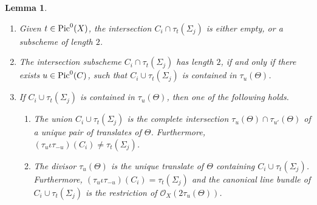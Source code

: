 \documentclass[12pt]{amsart}
\numberwithin{equation}{subsection}
\theoremstyle{plain}
\newtheorem{lem}[thm]{Lemma}
\theoremstyle{definition}
\newcommand{\StructureSheaf}[1]{{\mathcal O}_{#1}}
\newcommand{\Pic}{{\rm Pic}}
\begin{document}
\begin{lem}
\label{lemma-intersection-of-C-and-Sigma-has-length-at-most-2}
\begin{enumerate}
\item
\label{lemma-item-length-at-most-2}
Given $t\in \Pic^0(X)$, the intersection $C_i\cap \tau_t(\Sigma_j)$ is either empty, or a subscheme of length $2$.
\item
\label{lemma-item-length-is-2-iff}
The intersection subscheme $C_i\cap \tau_t(\Sigma_j)$ has length $2$, if and only if 
there exists $u\in\Pic^0(C)$, such that $C_i\cup \tau_t(\Sigma_j)$ is contained in $\tau_u(\Theta)$. 
\item
\label{lemma-item-one-or-two-theta-translates}
If  $C_i\cup \tau_t(\Sigma_j)$ is contained in $\tau_u(\Theta)$, then 
one of the following holds.
\begin{enumerate}
\item
\label{case-a-of-intersection-lemma}
The union $C_i\cup \tau_t(\Sigma_j)$ is the complete intersection $\tau_u(\Theta)\cap\tau_{u'}(\Theta)$ 
of a unique pair of translates of $\Theta$. 
Furthermore, $(\tau_u\iota\tau_{-u})(C_i)\neq\tau_t(\Sigma_j)$.
\item
\label{case-b-of-intersection-lemma}
The divisor $\tau_u(\Theta)$ is the unique translate of $\Theta$ containing $C_i\cup \tau_t(\Sigma_j)$. 
Furthermore, $(\tau_u\iota\tau_{-u})(C_i)=\tau_t(\Sigma_j)$ and the canonical line bundle of $C_i\cup \tau_t(\Sigma_j)$ is the restriction of $\StructureSheaf{X}(2\tau_u(\Theta))$.
\end{enumerate}
\end{enumerate}
\end{lem}
\end{document}
